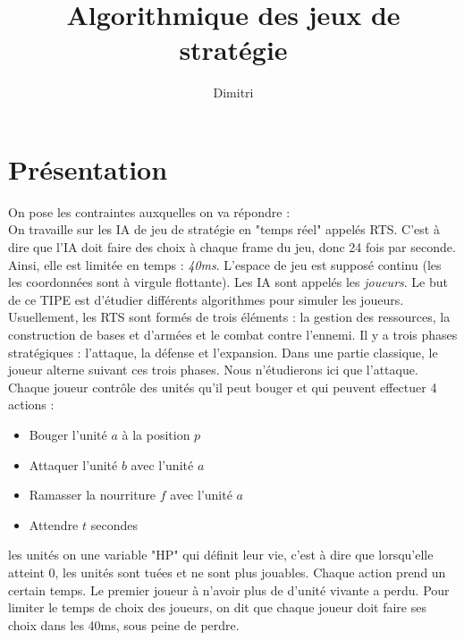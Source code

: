 \documentclass[a4paper, 11pt]{article}
\theoremstyle{definition}
\begin{document}
\title{Algorithmique des jeux de stratégie}
\author{Dimitri }

\section*{Présentation}
On pose les contraintes auxquelles on va répondre :\\
On travaille sur les IA de jeu de stratégie en "temps réel" appelés RTS. C'est à dire que
l'IA doit faire des choix à chaque frame du jeu, donc 24 fois par seconde. Ainsi,
elle est limitée en temps : \emph{40ms}. L'espace de jeu est supposé continu (les
les coordonnées sont à virgule flottante). Les IA sont appelés les \emph{joueurs}.
Le but de ce TIPE est d'étudier différents algorithmes pour simuler les joueurs.
Usuellement, les RTS sont formés de trois éléments : la gestion des ressources,
la construction de bases et d'armées et le combat contre l'ennemi. Il y a trois 
phases stratégiques : l'attaque, la défense et l'expansion. Dans une partie classique,
le joueur alterne suivant ces trois phases. Nous n'étudierons ici que l'attaque.
\\
Chaque joueur contrôle des unités qu'il peut bouger et qui peuvent effectuer 4
actions :
\begin{itemize}
    \item Bouger l'unité $a$ à la position $p$
    \item Attaquer l'unité $b$ avec l'unité $a$
    \item Ramasser la nourriture $f$ avec l'unité $a$
    \item Attendre $t$ secondes
\end{itemize}
les unités on une variable "HP" qui définit leur vie, c'est à dire que lorsqu'elle
atteint 0, les unités sont tuées et ne sont plus jouables. Chaque action prend
un certain temps.
Le premier joueur à n'avoir plus de d'unité vivante a perdu.
Pour limiter le temps de choix des joueurs, on dit que chaque joueur doit faire ses
choix dans les 40ms, sous peine de perdre.
\end{document}
